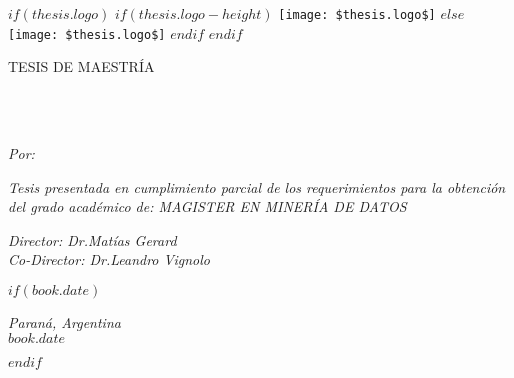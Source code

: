 \frontmatter %

\pagestyle{plain} %


\begin{titlepage}
\begin{center}

$if(thesis.logo)$
$if(thesis.logo-height)$
\texttt{[image: \$thesis.logo\$]} %
$else$
\texttt{[image: \$thesis.logo\$]}
$endif$
$endif$

\vspace*{.06\textheight}
\textsc{\Large TESIS DE MAESTRÍA}\\[0.5cm] %

\HRule \\[0.4cm] %
{\bfseries \MakeUppercase{\ttitle}\par}\vspace{0.4cm} %
\HRule \\[1.5cm] %
 
\begin{center} \large
\emph{Por: }\authorname
\end{center}

\vspace{1cm}

\vfill

\large \textit{Tesis presentada en cumplimiento parcial de los requerimientos para la obtención del grado académico de:
MAGISTER EN MINERÍA DE DATOS}\\[0.3cm] %
 
\vfill


\begin{center} \large
\emph{Director: Dr.Matías Gerard} \\
\emph{Co-Director: Dr.Leandro Vignolo} \\
\end{center}

\vspace{1cm}
 

$if(book.date)$
\begin{flushright}
\emph{Paraná, Argentina} \\
{\large $book.date$}\\[1cm] %
\end{flushright}
$endif$

 
\vfill
\end{center}
\end{titlepage}

